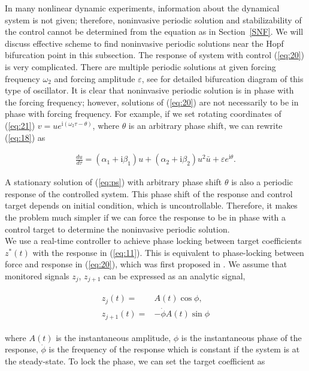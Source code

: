 \documentclass[openacc]{rsproca_new}%
\def\epsilon{\varepsilon}
\newcommand{\Eref}[1]{(\ref{#1})}
\newcommand{\Sref}[1]{Section~\ref{#1}}
\begin{document}
In many nonlinear dynamic experiments, information about the dynamical system is not given; therefore, noninvasive periodic solution and stabilizability of the control cannot be determined from the equation as in \Sref{SNF}. We will discuss effective scheme to find noninvasive periodic solutions near the Hopf bifurcation point in this subsection. The response of system with control \Eref{eq:20} is very complicated. There are multiple periodic solutions at given forcing frequency $\omega_2$ and forcing amplitude $\epsilon$, see \cite{zhang2011periodically,wiser2015bifurcations} for detailed bifurcation diagram of this type of oscillator. It is clear that noninvasive periodic solution is in phase with the forcing frequency; however, solutions of \Eref{eq:20} are not necessarily to be in phase with forcing frequency. For example, if we set rotating coordinates of \Eref{eq:21} $v=ue^{\textrm{i}(\omega_2 \tau-\theta)}$, where $\theta$ is an arbitrary phase shift, we can rewrite \Eref{eq:18}
as

\begin{align}\label{eq:ps}
\frac{du}{d\tau}=(\alpha_1+\textrm{i}\beta_1)u+(\alpha_2+\textrm{i}\beta_2)u^2 \bar u+\epsilon e^{\textrm{i}\theta}.
\end{align}

\noindent A stationary solution of \Eref{eq:ps} with arbitrary phase shift $\theta$ is also a periodic response of the controlled system. This phase shift of the response and control target depends on initial condition, which is uncontrollable. Therefore, it makes the problem much simpler if we can force the response to be in phase with a control target to determine the noninvasive periodic solution.\\
We use a real-time controller to achieve phase locking between target coefficients $z^*(t)$ with the response in \Eref{eq:11}. This is equivalent to phase-locking between force and response in \Eref{eq:20}, which was first proposed in \cite{irene}. We assume that monitored signals $z_j$, $z_{j+1}$ can be expressed as an analytic signal,

\begin{align}\label{eq:25}
\begin{split}
z_{j}(t)=&A(t)\cos{\phi},\\
z_{j+1}(t)=&-\dot\phi A(t)\sin{\phi}
\end{split}
\end{align}

\noindent where $A(t)$ is the instantaneous amplitude, $\phi$ is the instantaneous phase of the response, $\dot\phi$ is the frequency of the response which is constant if the system is at the steady-state. To lock the phase, we can set the target coefficient as
\end{document}
